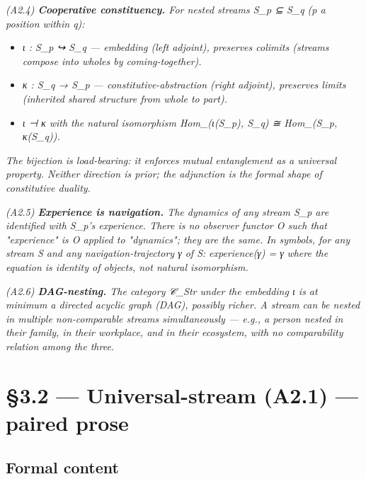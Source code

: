 \documentclass[11pt, openany]{book}
\newcommand{\sectionbreak}{\clearpage}
\begin{document}
\textit{(A2.4) \textbf{Cooperative constituency.} For nested streams S\_\allowbreak{}p ⊆ S\_\allowbreak{}q (p a position within q):}

\begin{itemize}
\item \textit{ι : S\_\allowbreak{}p ↪ S\_\allowbreak{}q --- embedding (left adjoint), preserves colimits (streams compose into wholes by coming-together).}
\item \textit{κ : S\_\allowbreak{}q → S\_\allowbreak{}p --- constitutive-abstraction (right adjoint), preserves limits (inherited shared structure from whole to part).}
\item \textit{ι ⊣ κ with the natural isomorphism Hom\_(ι(S\_\allowbreak{}p), S\_\allowbreak{}q) ≅ Hom\_(S\_\allowbreak{}p, κ(S\_\allowbreak{}q)).}
\end{itemize}

\textit{The bijection is load-bearing: it enforces mutual entanglement as a universal property. Neither direction is prior; the adjunction is the formal shape of constitutive duality.}

\textit{(A2.5) \textbf{Experience is navigation.} The dynamics of any stream S\_\allowbreak{}p are identified with S\_\allowbreak{}p's experience. There is no observer functor O such that "experience" is O applied to "dynamics"; they are the same. In symbols, for any stream S and any navigation-trajectory γ of S:}
\textit{experience(γ) = γ}
\textit{where the equation is identity of objects, not natural isomorphism.}

\textit{(A2.6) \textbf{DAG-nesting.} The category 𝒞\_\allowbreak{}Str under the embedding ι is at minimum a directed acyclic graph (DAG), possibly richer. A stream can be nested in multiple non-comparable streams simultaneously --- e.g., a person nested in their family, in their workplace, and in their ecosystem, with no comparability relation among the three.}

\sectionbreak

\section{§3.2 --- Universal-stream (A2.1) --- paired prose}

\subsection{Formal content}
\end{document}
